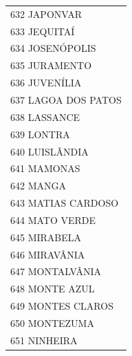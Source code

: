 \documentclass{article}
\begin{document}
\begin{longtable}[c]{m{18cm}}
\multicolumn{1}{l}{ \hspace{2em} 632 JAPONVAR } \\
\multicolumn{1}{l}{ \hspace{2em} 633 JEQUITAÍ } \\
\multicolumn{1}{l}{ \hspace{2em} 634 JOSENÓPOLIS } \\
\multicolumn{1}{l}{ \hspace{2em} 635 JURAMENTO } \\
\multicolumn{1}{l}{ \hspace{2em} 636 JUVENÍLIA } \\
\multicolumn{1}{l}{ \hspace{2em} 637 LAGOA DOS PATOS } \\
\multicolumn{1}{l}{ \hspace{2em} 638 LASSANCE } \\
\multicolumn{1}{l}{ \hspace{2em} 639 LONTRA } \\
\multicolumn{1}{l}{ \hspace{2em} 640 LUISLÂNDIA } \\
\multicolumn{1}{l}{ \hspace{2em} 641 MAMONAS } \\
\multicolumn{1}{l}{ \hspace{2em} 642 MANGA } \\
\multicolumn{1}{l}{ \hspace{2em} 643 MATIAS CARDOSO } \\
\multicolumn{1}{l}{ \hspace{2em} 644 MATO VERDE } \\
\multicolumn{1}{l}{ \hspace{2em} 645 MIRABELA } \\
\multicolumn{1}{l}{ \hspace{2em} 646 MIRAVÂNIA } \\
\multicolumn{1}{l}{ \hspace{2em} 647 MONTALVÂNIA } \\
\multicolumn{1}{l}{ \hspace{2em} 648 MONTE AZUL } \\
\multicolumn{1}{l}{ \hspace{2em} 649 MONTES CLAROS } \\
\multicolumn{1}{l}{ \hspace{2em} 650 MONTEZUMA } \\
\multicolumn{1}{l}{ \hspace{2em} 651 NINHEIRA } \\

\end{longtable}
\end{document}
